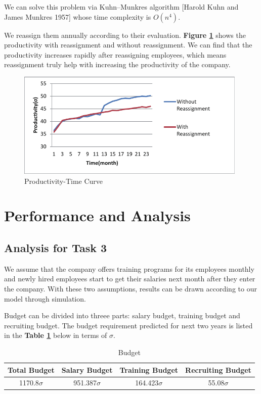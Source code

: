 \documentclass[12pt,a4paper,titlepage]{article}
\begin{document}
We can solve this problem via Kuhn–Munkres algorithm [Harold Kuhn and
James Munkres 1957] whose time complexity is $O(n^4)$.

We reassign them annually according to their
evaluation. \textbf{Figure \ref{reassign}} shows the productivity with reassignment
and without reassignment. We can find that the productivity increases
rapidly after reassigning employees, which means reassignment truly help
with increasing the productivity of the company.

\begin{figure}[htb]
  \centering
  \includegraphics[width=11cm]{p3.pdf}
  \caption{Productivity-Time Curve}\label{reassign}
\end{figure}

\section{Performance and Analysis}
\label{sec:performance-and-analysis}

\subsection{Analysis for Task 3}
\label{sec:analysis-for-task-3}

We assume that the company offers training programs for its employees monthly and newly hired employees start to get their salaries next month after they enter the company. With these two assumptions, results can be drawn according to our model through simulation.

Budget can be divided into threee parts: salary budget, training budget and recruiting budget. The budget requirement predicted for next two years is listed in the \textbf{Table \ref{t3_t} }below in terms of $\sigma$.
\\
\begin{table}[htb]
        \centering
        \begin{tabular}{*{4}{c}}\toprule[2pt]
        Total Budget & Salary Budget & Training Budget & Recruiting Budget\\ \midrule
        1170.8$\sigma$ & 951.387$\sigma$ & 164.423$\sigma$ & 55.08$\sigma$ \\ \bottomrule[2pt]
        \end{tabular}
        \caption{Budget}\label{t3_t}
\end{table}
\end{document}
